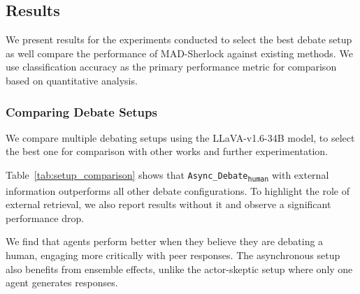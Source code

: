 \documentclass{article}
\theoremstyle{plain}
\theoremstyle{definition}
\theoremstyle{remark}
\newcommand{\frameworkname}{MAD-Sherlock}
\begin{document}
\subsection{Results}
We present results for the experiments conducted to select the best debate setup as well compare the performance of \frameworkname{} against existing methods. We use classification accuracy as the primary performance metric for comparison based on quantitative analysis.
\subsubsection{Comparing Debate Setups}
We compare multiple debating setups using the LLaVA-v1.6-34B model, to select the best one for comparison with other works and further experimentation. 
\begin{table}[h]
\centering
{}
\vspace{0.2cm}
\caption{\textbf{Performance comparison between different debate setups: } We observe best performance with the \texttt{The Async\_Debate\textsubscript{human}} set-up, in which the model has external context and believes it is debating a human.}
\label{tab:setup_comparison}
\end{table}

Table~\ref{tab:setup_comparison} shows that \texttt{Async\_Debate\textsubscript{human}} with external information outperforms all other debate configurations. To highlight the role of external retrieval, we also report results without it and observe a significant performance drop.

We find that agents perform better when they believe they are debating a human, engaging more critically with peer responses. The asynchronous setup also benefits from ensemble effects, unlike the actor-skeptic setup where only one agent generates responses.
\end{document}
